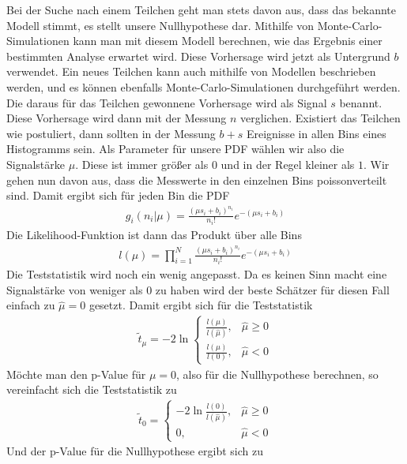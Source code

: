 Bei der Suche nach einem Teilchen geht man stets davon aus, dass das bekannte Modell stimmt, es stellt unsere Nullhypothese dar.
Mithilfe von Monte-Carlo-Simulationen kann man mit diesem Modell berechnen, wie das Ergebnis einer bestimmten Analyse erwartet wird.
Diese Vorhersage wird jetzt als Untergrund $b$ verwendet.
Ein neues Teilchen kann auch mithilfe von Modellen beschrieben werden, und es können ebenfalls Monte-Carlo-Simulationen durchgeführt werden.
Die daraus für das Teilchen gewonnene Vorhersage wird als Signal $s$ benannt.
Diese Vorhersage wird dann mit der Messung $n$ verglichen.
Existiert das Teilchen wie postuliert, dann sollten in der Messung $b+s$ Ereignisse in allen Bins eines Histogramms sein.
Als Parameter für unsere PDF wählen wir also die Signalstärke $\mu$.
Diese ist immer größer als $0$ und in der Regel kleiner als $1$.
Wir gehen nun davon aus, dass die Messwerte in den einzelnen Bins poissonverteilt sind.
Damit ergibt sich für jeden Bin die PDF
\begin{gather}
g_{i}(n_{i}|\mu) = \frac{\left ( \mu s_{i}+b_{i}\right)^{n_{i}}}{n_{i}!} e^{-\left ( \mu s_{i}+b_{i}\right)}
\end{gather}
Die Likelihood-Funktion ist dann das Produkt über alle Bins
\begin{gather}
l(\mu) = \prod_{i=1}^{N} \frac{\left ( \mu s_{i}+b_{i}\right)^{n_{i}}}{n_{i}!} e^{-\left ( \mu s_{i}+b_{i}\right)}
\end{gather}
Die Teststatistik wird noch ein wenig angepasst.
Da es keinen Sinn macht eine Signalstärke von weniger als $0$ zu haben wird der beste Schätzer für diesen Fall einfach zu $\hat{\mu} = 0$ gesetzt. Damit ergibt sich für die Teststatistik
\begin{gather}
\tilde{t}_{\mu} = -2\ln{}
\begin{cases}
\frac{l(\mu)}{l(\hat{\mu})}, & \hat{\mu} \geq 0 \\
\frac{l(\mu)}{l(0)}, & \hat{\mu} < 0
\end{cases}
\end{gather}
Möchte man den p-Value für $\mu = 0$, also für die Nullhypothese berechnen, so vereinfacht sich die Teststatistik zu
\begin{gather}
\tilde{t}_{0} =
\begin{cases}
-2 \ln{\frac{l(0)}{l(\hat{\mu})}}, & \hat{\mu} \geq 0 \\
0, & \hat{\mu} < 0
\end{cases}
\end{gather}
Und der p-Value für die Nullhypothese ergibt sich zu
